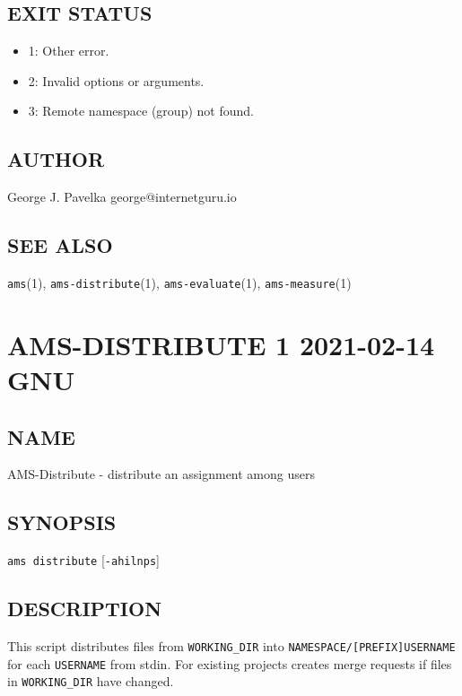 \subsection{EXIT STATUS}\label{exit-status-1}

\begin{itemize}
\item
  1: Other error.
\item
  2: Invalid options or arguments.
\item
  3: Remote namespace (group) not found.
\end{itemize}

\subsection{AUTHOR}\label{author-1}

George J. Pavelka george@internetguru.io

\subsection{SEE ALSO}\label{see-also-1}

\texttt{ams}(1), \texttt{ams-distribute}(1), \texttt{ams-evaluate}(1), \texttt{ams-measure}(1)

\section{AMS-DISTRIBUTE 1 2021-02-14 GNU}\label{ams-distribute-1-2021-02-14-gnu-user-manuals}

\subsection{NAME}\label{name-2}

AMS-Distribute - distribute an assignment among users

\subsection{SYNOPSIS}\label{synopsis-2}

\texttt{ams\ distribute} {[}\texttt{-ahilnps}{]}

\subsection{DESCRIPTION}\label{description-2}

This script distributes files from \texttt{WORKING\_DIR} into \texttt{NAMESPACE/{[}PREFIX{]}USERNAME} for each \texttt{USERNAME} from stdin. For existing projects creates merge requests if files in \texttt{WORKING\_DIR} have changed.

